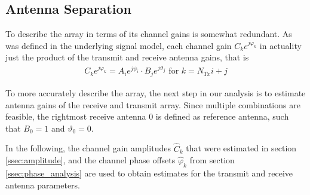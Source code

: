 \subsection{Antenna Separation}
To describe the array in terms of its channel gains is somewhat redundant.
As was defined in the underlying signal model, each channel gain $C_ke^{j\varphi_k}$ in actuality
just the product of the transmit and receive antenna gains, that is
\begin{align}
    C_ke^{j\varphi_k} = A_i e^{j\psi_i} \cdot B_j e^{j\vartheta_j} \text{ for } k=N_{Tx}i+j
\end{align}

To more accurately describe the array,
the next step in our analysis is to estimate antenna gains of the receive and transmit array.
Since multiple combinations are feasible, the rightmost receive antenna 0 is defined as reference antenna,
such that $B_0=1$ and $\vartheta_0 = 0$.

In the following, the channel gain amplitudes $\hat C_k$ that were estimated in section \ref{ssec:amplitude},
and the channel phase offsets $\hat \varphi_k$ from section \ref{ssec:phase_analysis}
are used to obtain estimates for the transmit and receive antenna parameters. \\

